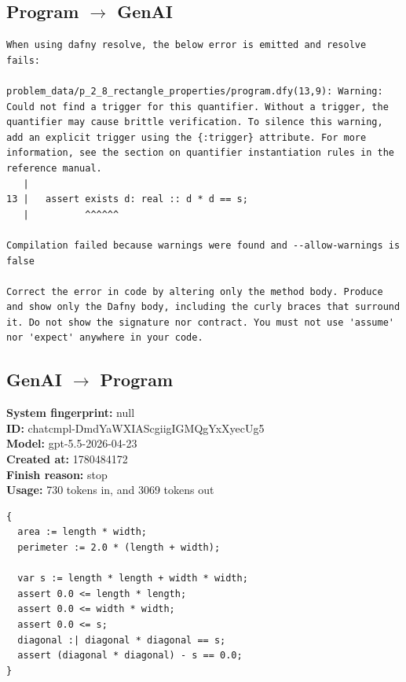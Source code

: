 \documentclass{article}
\begin{document}
\subsection*{Program $\rightarrow$ GenAI}
\begin{lstlisting}
When using dafny resolve, the below error is emitted and resolve fails:

problem_data/p_2_8_rectangle_properties/program.dfy(13,9): Warning: Could not find a trigger for this quantifier. Without a trigger, the quantifier may cause brittle verification. To silence this warning, add an explicit trigger using the {:trigger} attribute. For more information, see the section on quantifier instantiation rules in the reference manual.
   |
13 |   assert exists d: real :: d * d == s;
   |          ^^^^^^

Compilation failed because warnings were found and --allow-warnings is false

Correct the error in code by altering only the method body. Produce and show only the Dafny body, including the curly braces that surround it. Do not show the signature nor contract. You must not use 'assume' nor 'expect' anywhere in your code.
\end{lstlisting}
\subsection*{GenAI $\rightarrow$ Program}
\textbf{System fingerprint: }null
\\\textbf{ID: }chatcmpl-DmdYaWXIAScgiigIGMQgYxXyecUg5
\\\textbf{Model: }gpt-5.5-2026-04-23
\\\textbf{Created at: }1780484172
\\\textbf{Finish reason: }stop
\\\textbf{Usage: }730 tokens in, and 3069 tokens out
\begin{lstlisting}
{
  area := length * width;
  perimeter := 2.0 * (length + width);

  var s := length * length + width * width;
  assert 0.0 <= length * length;
  assert 0.0 <= width * width;
  assert 0.0 <= s;
  diagonal :| diagonal * diagonal == s;
  assert (diagonal * diagonal) - s == 0.0;
}
\end{lstlisting}
\end{document}
